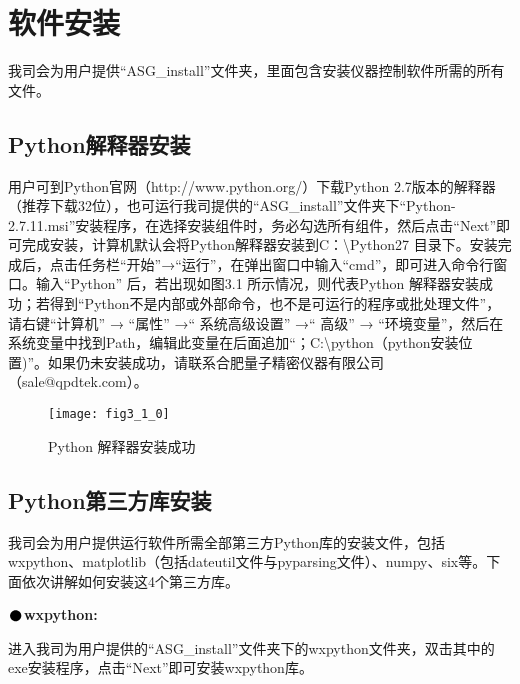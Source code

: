 \pagestyle{fancy}
\chapter{\heiti 软件安装}
\setmainfont{Times New Roman}

我司会为用户提供“ASG\_install”文件夹，里面包含安装仪器控制软件所需的所有文件。

\section{Python\heiti 解释器安装}
用户可到Python官网（http://www.python.org/）下载Python 2.7版本的解释器（推荐下载32位），也可运行我司提供的“ASG\_install”文件夹下“Python-2.7.11.msi”安装程序，在选择安装组件时，务必勾选所有组件，然后点击“Next”即可完成安装，计算机默认会将Python解释器安装到C：\textbackslash Python27 目录下。安装完成后，点击任务栏“开始”→“运行”，在弹出窗口中输入“cmd”，即可进入命令行窗口。输入“Python” 后，若出现如图3.1 所示情况，则代表Python 解释器安装成功；若得到“Python不是内部或外部命令，也不是可运行的程序或批处理文件”，请右键“计算机” → “属性” →“ 系统高级设置” →“ 高级” → “环境变量”，然后在系统变量中找到Path，编辑此变量在后面追加“；C:\textbackslash python（python安装位置)”。如果仍未安装成功，请联系合肥量子精密仪器有限公司（sale@qpdtek.com）。
\begin{figure}[ht]
\centering
\texttt{[image: fig3\_1\_0]}
\caption{Python 解释器安装成功}
\end{figure}

\newpage
\section{Python\heiti 第三方库安装}
我司会为用户提供运行软件所需全部第三方Python库的安装文件，包括wxpython、matplotlib（包括dateutil文件与pyparsing文件）、numpy、six等。下面依次讲解如何安装这4个第三方库。
\vspace{0.3cm}

\noindent$\vcenter{\hbox{\huge$\bullet$}}$\quad\fontsize{12pt}{\baselineskip}\textbf{wxpython:}

进入我司为用户提供的“ASG\_install”文件夹下的wxpython文件夹，双击其中的exe安装程序，点击“Next”即可安装wxpython库。
\vspace{0.3cm}

